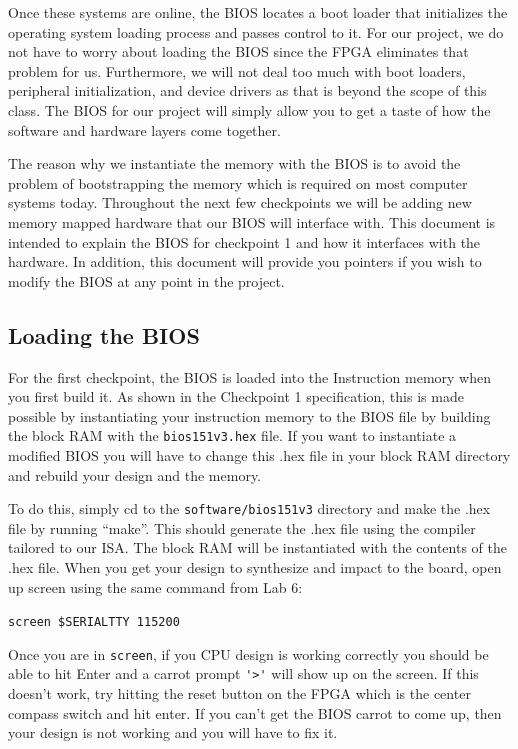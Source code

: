 \documentclass[11pt]{article}
\begin{document}
Once these systems are online, the BIOS locates a boot loader that initializes the operating
system loading process and passes control to it. For our project, we do not have to worry about
loading the BIOS since the FPGA eliminates that problem for us. Furthermore, we will not deal
too much with boot loaders, peripheral initialization, and device drivers as that is beyond the
scope of this class. The BIOS for our project will simply allow you to get a taste of how the
software and hardware layers come together.

The reason why we instantiate the memory with the BIOS is to avoid the problem of
bootstrapping the memory which is required on most computer systems today. Throughout the
next few checkpoints we will be adding new memory mapped hardware that our BIOS will
interface with. This document is intended to explain the BIOS for checkpoint 1 and how it
interfaces with the hardware. In addition, this document will provide you pointers if you wish to
modify the BIOS at any point in the project.

\subsection{Loading the BIOS}
For the first checkpoint, the BIOS is loaded into the Instruction memory when you first build it.
As shown in the Checkpoint 1 specification, this is made possible by instantiating your
instruction memory to the BIOS file by building the block RAM with the \verb|bios151v3.hex| file. If you
want to instantiate a modified BIOS you will have to change this .hex file in your block RAM
directory and rebuild your design and the memory.

To do this, simply cd to the \verb|software/bios151v3| directory and make the .hex file by running
“make”. This should generate the .hex file using the compiler tailored to our ISA. The
block RAM will be instantiated with the contents of the .hex file.
When you get your design to synthesize and impact to the board, open up screen using the
same command from Lab 6:

\verb|screen $SERIALTTY 115200|

Once you are in \verb|screen|, if you CPU design is working correctly you should be able to hit Enter
and a carrot prompt \verb|'>'| will show up on the screen. If this doesn’t work, try hitting the reset
button on the FPGA which is the center compass switch and hit enter. If you can’t get the BIOS
carrot to come up, then your design is not working and you will have to fix it.
\end{document}
